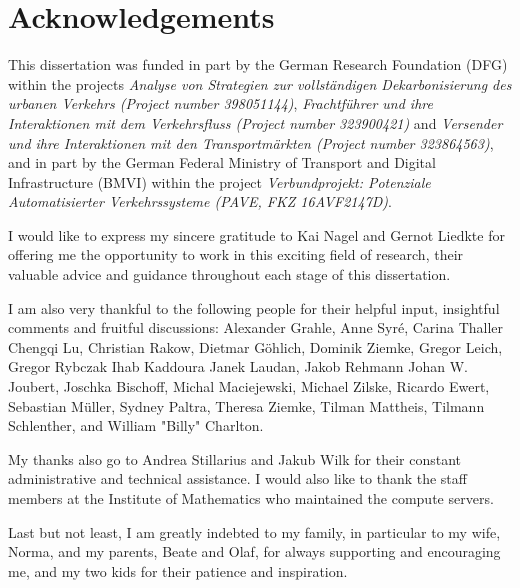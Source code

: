 
\thispagestyle{empty}

\chapter*{Acknowledgements}

This dissertation was funded in part by the German Research Foundation (DFG) within the projects
\emph{Analyse von Strategien zur vollständigen Dekarbonisierung des urbanen Verkehrs (Project number 398051144)}, 
\emph{Frachtführer und ihre Interaktionen mit dem Verkehrsfluss (Project number 323900421)} and
\emph{Versender und ihre Interaktionen mit den Transportmärkten (Project number 323864563)}, 
and in part by the German Federal Ministry of Transport and Digital Infrastructure (BMVI) within the project
\emph{Verbundprojekt: Potenziale Automatisierter Verkehrssysteme (PAVE, FKZ 16AVF2147D)}.

I would like to express my sincere gratitude to Kai Nagel and Gernot Liedkte for offering me the opportunity to work in this exciting field of research, their valuable advice and guidance throughout each stage of this dissertation. 

I am also very thankful to the following people for their helpful input, insightful comments and fruitful discussions:
Alexander Grahle,
Anne Syré,
Carina Thaller
Chengqi Lu,
Christian Rakow,
Dietmar Göhlich,
Dominik Ziemke,
Gregor Leich,
Gregor Rybczak
Ihab Kaddoura
Janek Laudan,
Jakob Rehmann
Johan W. Joubert, 
Joschka Bischoff,
Michal Maciejewski,
Michael Zilske,
Ricardo Ewert,
Sebastian Müller,
Sydney Paltra,
Theresa Ziemke,
Tilman Mattheis,
Tilmann Schlenther,
and William "Billy" Charlton.

My thanks also go to Andrea Stillarius and Jakub Wilk for their constant administrative and technical assistance. I would also like to thank the staff members at the Institute of Mathematics who maintained the compute servers.

Last but not least, I am greatly indebted to my family, in particular to my wife, Norma, and my parents, Beate and Olaf, for always supporting and encouraging me, and my two kids for their patience and inspiration.

\newpage
